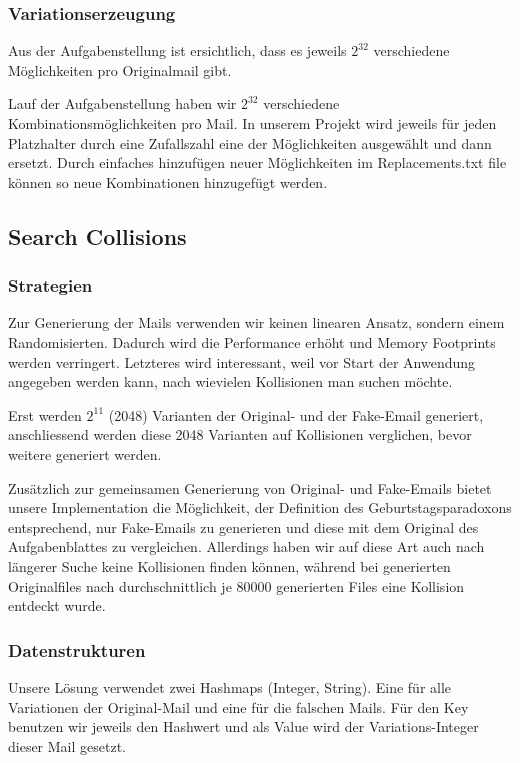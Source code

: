 \documentclass[12pt]{scrartcl}
\begin{document}
\subsubsection{Variationserzeugung}
Aus der Aufgabenstellung ist ersichtlich, dass es jeweils $2^{32}$ verschiedene Möglichkeiten pro Originalmail gibt.


Lauf der Aufgabenstellung haben wir $2^{32}$ verschiedene Kombinationsmöglichkeiten pro Mail. In unserem Projekt wird jeweils für jeden Platzhalter durch eine Zufallszahl eine der Möglichkeiten ausgewählt und dann ersetzt. Durch einfaches hinzufügen neuer Möglichkeiten im Replacements.txt file können so neue Kombinationen hinzugefügt werden.

\subsection{Search Collisions}
\subsubsection{Strategien}
Zur Generierung der Mails verwenden wir keinen linearen Ansatz, sondern einem Randomisierten. Dadurch wird die Performance erhöht und Memory Footprints werden verringert. Letzteres wird interessant, weil vor Start der Anwendung angegeben werden kann, nach wievielen Kollisionen man suchen möchte.

Erst werden $2^{11}$ (2048) Varianten der Original- und der Fake-Email generiert, anschliessend werden diese 2048 Varianten auf Kollisionen verglichen, bevor weitere generiert werden.

Zusätzlich zur gemeinsamen Generierung von Original- und Fake-Emails bietet unsere Implementation die Möglichkeit, der Definition des Geburtstagsparadoxons entsprechend, nur Fake-Emails zu generieren und diese mit dem Original des Aufgabenblattes zu vergleichen. Allerdings haben wir auf diese Art auch nach längerer Suche keine Kollisionen finden können, während bei generierten Originalfiles nach durchschnittlich je 80000 generierten Files eine Kollision entdeckt wurde.

\subsubsection{Datenstrukturen}
Unsere Lösung verwendet zwei Hashmaps (Integer, String). Eine für alle Variationen der Original-Mail und eine für die falschen Mails. Für den Key benutzen wir jeweils den Hashwert und als Value wird der Variations-Integer dieser Mail gesetzt.
 
\end{document}
